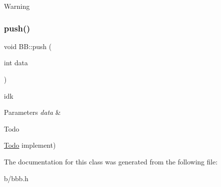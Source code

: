 \begin{DoxyWarning}{Warning}

\end{DoxyWarning}
\mbox{\label{classBB_a7e8f436769f43baf81ac99a80f510c32}} 
\subsubsection{\texorpdfstring{push()}{push()}}
{\footnotesize\ttfamily void B\+B\+::push (\begin{DoxyParamCaption}\item[{int}]{data }\end{DoxyParamCaption})}



idk 


\begin{DoxyParams}{Parameters}
{\em data} & \\
\hline
\end{DoxyParams}
\begin{DoxyRefDesc}{Todo}
\item[\hyperlink{todo__todo000003}{Todo}]implement) \end{DoxyRefDesc}


The documentation for this class was generated from the following file\+:\begin{DoxyCompactItemize}
\item 
b/bbb.\+h\end{DoxyCompactItemize}
